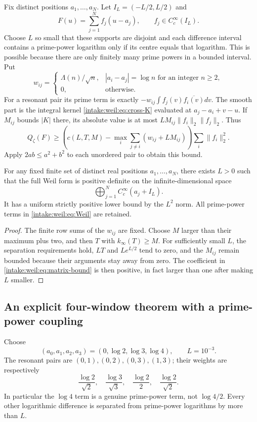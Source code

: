 Fix distinct positions $a_1,\ldots,a_N$. Let $I_L=(-L/2,L/2)$ and
\[
 F(u)=\sum_{j=1}^N f_j(u-a_j),\qquad f_j\in C_c^\infty(I_L).
\]
Choose $L$ so small that these supports are disjoint and each difference interval contains a prime-power logarithm only if its centre equals that logarithm. This is possible because there are only finitely many prime powers in a bounded interval. Put
\[
 w_{ij}=\begin{cases}
 \Lambda(n)/\sqrt n,&|a_i-a_j|=\log n\text{ for an integer }n\ge2,\\
 0,&\text{otherwise}.
 \end{cases}
\]
For a resonant pair its prime term is exactly $-w_{ij}\int f_j(v)\overline{f_i(v)}dv$. The smooth part is the integral kernel \eqref{intake:weil:eq:cross-K} evaluated at $a_j-a_i+v-u$. If $M_{ij}$ bounds $|K|$ there, its absolute value is at most $LM_{ij}\|f_i\|_2\|f_j\|_2$. Thus
\begin{equation}\label{intake:weil:eq:matrix-bound}
 Q_\zeta(F)\ge
 \left(c(L,T,M)-\max_i\sum_{j\ne i}(w_{ij}+LM_{ij})\right)
       \sum_i\|f_i\|_2^2.
\end{equation}
Apply $2ab\le a^2+b^2$ to each unordered pair to obtain this bound.

\begin{theorem}\label{intake:weil:thm:any-windows}
For any fixed finite set of distinct real positions $a_1,\ldots,a_N$, there exists $L>0$ such that the full Weil form is positive definite on the infinite-dimensional space
\[
 \bigoplus_{j=1}^N C_c^\infty(a_j+I_L).
\]
It has a uniform strictly positive lower bound by the $L^2$ norm. All prime-power terms in \eqref{intake:weil:eq:Weil} are retained.
\end{theorem}
\begin{proof}
The finite row sums of the $w_{ij}$ are fixed. Choose $M$ larger than their maximum plus two, and then $T$ with $k_\infty(T)\ge M$. For sufficiently small $L$, the separation requirements hold, $LT$ and $Le^{L/2}$ tend to zero, and the $M_{ij}$ remain bounded because their arguments stay away from zero. The coefficient in \eqref{intake:weil:eq:matrix-bound} is then positive, in fact larger than one after making $L$ smaller. 
\end{proof}

\subsection{An explicit four-window theorem with a prime-power coupling}
Choose
\[
 (a_0,a_1,a_2,a_3)=(0,\log2,\log3,\log4),\qquad L=10^{-3}.
\]
The resonant pairs are $(0,1),(0,2),(0,3),(1,3)$; their weights are respectively
\[
 \frac{\log2}{\sqrt2},\quad\frac{\log3}{\sqrt3},\quad
 \frac{\log2}{2},\quad\frac{\log2}{\sqrt2}.
\]
In particular the $\log4$ term is a genuine prime-power term, not $\log4/2$. Every other logarithmic difference is separated from prime-power logarithms by more than $L$.


